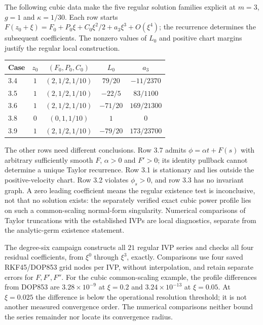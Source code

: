 The following cubic data make the five regular solution families explicit
at $m=3$, $g=1$ and $\kappa=1/30$. Each row starts
$F(z_0+\xi)=F_0+P_0\xi+C_0\xi^2/2+a_3\xi^3+O(\xi^4)$;
the recurrence determines the subsequent coefficients. The nonzero values
of $L_0$ and positive chart margins justify the regular local construction.
\begin{center}\small
\begin{tabular}{@{}lcccc@{}}
\toprule
Case & $z_0$ & $(F_0,P_0,C_0)$ & $L_0$ & $a_3$\\
\midrule
3.4 & $1$ & $(2,1/2,1/10)$ & $79/20$ & $-11/2370$\\
3.5 & $1$ & $(2,1/2,1/10)$ & $-22/5$ & $83/1100$\\
3.6 & $1$ & $(2,1/2,1/10)$ & $-71/20$ & $169/21300$\\
3.8 & $0$ & $(0,1,1/10)$ & $1$ & $0$\\
3.9 & $1$ & $(2,1/2,1/10)$ & $-79/20$ & $173/23700$\\
\bottomrule
\end{tabular}
\end{center}

The other rows need different conclusions. Row 3.7 admits
$\phi=\alpha t+F(s)$ with arbitrary sufficiently smooth $F$, $\alpha>0$
and $F'>0$; its identity pullback cannot determine a unique Taylor
recurrence. Row 3.1 is stationary and lies outside the positive-velocity
chart. Row 3.2 violates $\phi_s>0$, and row 3.3 has no invariant graph.
A zero leading coefficient means the regular existence test is inconclusive,
not that no solution exists: the separately verified exact cubic power
profile lies on such a common-scaling normal-form singularity. Numerical
comparisons of Taylor truncations with the established IVPs are local
diagnostics, separate from the analytic-germ existence statement.

The degree-six campaign constructs all $21$ regular IVP series and checks
all four residual coefficients, from $\xi^0$ through $\xi^3$, exactly.
Comparisons use four saved RKF45/DOP853 grid nodes per IVP, without
interpolation, and retain separate errors for $F,F',F''$. For the cubic
common-scaling example, the profile differences from DOP853 are
$3.28\times10^{-9}$ at $\xi=0.2$ and $3.24\times10^{-13}$ at $\xi=0.05$.
At $\xi=0.025$ the difference is below the operational resolution threshold;
it is not another measured convergence order. The numerical comparisons
neither bound the series remainder nor locate its convergence radius.

